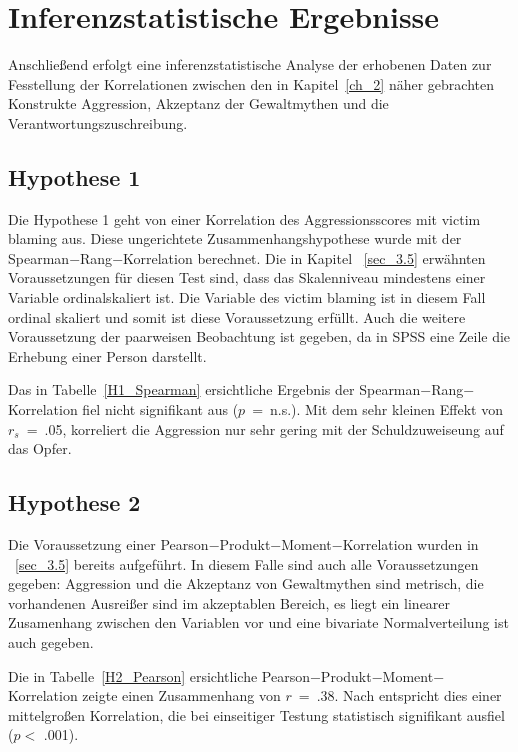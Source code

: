 \section{Inferenzstatistische Ergebnisse}    \label{sec_4.3}
Anschließend erfolgt eine inferenzstatistische Analyse der erhobenen Daten zur Fesstellung der Korrelationen zwischen den in Kapitel~\ref{ch_2} näher gebrachten Konstrukte Aggression, Akzeptanz der Gewaltmythen und die Verantwortungszuschreibung. 


\subsection{Hypothese 1}    \label{subsec_4.3.1}
Die Hypothese 1 geht von einer Korrelation des Aggressionsscores mit victim blaming aus. Diese ungerichtete Zusammenhangshypothese wurde mit der Spearman$-$Rang$-$Korrelation berechnet.
Die in Kapitel ~\ref{sec_3.5} erwähnten Voraussetzungen für diesen Test sind, dass das Skalenniveau mindestens einer Variable ordinalskaliert ist. Die Variable des victim blaming ist in diesem Fall ordinal skaliert und somit ist diese Voraussetzung erfüllt. Auch die weitere Voraussetzung der paarweisen Beobachtung ist gegeben, da in SPSS eine Zeile die Erhebung einer Person darstellt. 

Das in Tabelle~\ref{H1_Spearman} ersichtliche Ergebnis der Spearman$-$Rang$-$Korrelation fiel nicht signifikant aus ($p$~=~n.s.). Mit dem sehr kleinen Effekt \parencite{Cohen_1992} von $r_s $~=~.05, korreliert die Aggression nur sehr gering mit der Schuldzuweiseung auf das Opfer. 


\subsection{Hypothese 2}    \label{subsec_4.3.2}
Die Voraussetzung einer Pearson$-$Produkt$-$Moment$-$Korrelation wurden in ~\ref{sec_3.5} bereits aufgeführt. In diesem Falle sind auch alle Voraussetzungen gegeben: Aggression und die Akzeptanz von Gewaltmythen sind metrisch, die vorhandenen Ausreißer sind im akzeptablen Bereich, es liegt ein linearer Zusamenhang zwischen den Variablen vor und eine bivariate Normalverteilung ist auch gegeben.

Die in Tabelle~\ref{H2_Pearson} ersichtliche Pearson$-$Produkt$-$Moment$-$Korrelation zeigte einen Zusammenhang von $r$~=~.38. Nach \textcite{Cohen_1992} entspricht dies einer mittelgroßen Korrelation, die bei einseitiger Testung statistisch signifikant ausfiel ($p<$ .001).



